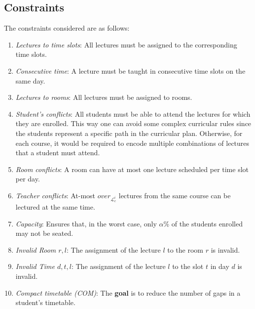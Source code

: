 \documentclass[runningheads]{llncs}
\begin{document}
\subsection{Constraints}

The constraints considered are as follows:
\begin{enumerate}
\item 
{\em Lectures to time slots}: All lectures must be assigned to the corresponding time slots.
\item {\em Consecutive time}: A lecture must be taught in consecutive time slots on the same day. 
\item {\em Lectures to rooms}: All lectures must be assigned to rooms.
\item {\em Student's conflicts}: All students must be able to attend the lectures for which they are enrolled. This way one can avoid some complex curricular rules since the students represent a specific path in the curricular plan. Otherwise, for each course, it would be required to encode multiple combinations of lectures that a student must attend. 
\item {\em Room conflicts}: A room can have at most one lecture scheduled per time slot per day.
\item {\em Teacher conflicts}: At-most $over_{\mathcal{L}_c^{i}}$ lectures from the same course can be lectured at the same time. 
\item {\em Capacity}: Ensures that, in the worst case, only $\alpha$\% of the students enrolled may not be seated. %
\item {\em Invalid Room $r,l$}: The assignment of the lecture $l$ to the room $r$ is invalid.
\item {\em Invalid Time $d,t,l$}: The assignment of the lecture $l$ to the slot $t$ in day $d$ is invalid.
\item {\em Compact timetable (COM)}: The \textbf{goal} is to reduce the number of gaps in a student's timetable.


\end{enumerate}
\end{document}
